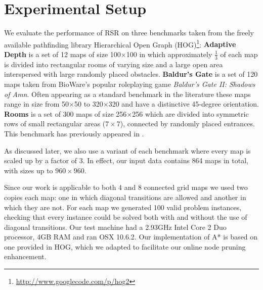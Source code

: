 \section{Experimental Setup}
We evaluate the performance of RSR on three benchmarks taken from
the freely available pathfinding library 
Hierarchical Open Graph (HOG)\footnote{\url{http://www.googlecode.com/p/hog2}}:
{\textbf{Adaptive Depth} is a set of 12 maps of size 100$\times$100 in which approximately
$\frac{1}{3}$ of each map is divided into rectangular rooms of
varying size and a large open area interspersed with 
large randomly placed obstacles.}
{\textbf{Baldur's Gate} is a set of 120 maps taken from BioWare's popular
roleplaying game \emph{Baldur's Gate II: Shadows of Amn}. 
Often appearing as a standard benchmark in the literature 
\cite{bjornsson06,harabor10,pochter10} these maps range in 
size from 50$\times$50 to 320$\times$320 and have a distinctive 45-degree orientation.}
{\textbf{Rooms} is a set of 300 maps of size 256$\times$256 which are
divided into symmetric rows of small rectangular areas ($7\times7$), connected
by randomly placed entrances. This benchmark has previously appeared in
\cite{pochter10}.}

As discussed later, we also use a variant of each benchmark where 
every map is scaled up by a factor of 3. In effect, our input data contains 864 maps in total,
with sizes up to $960\times960$.

Since our work is applicable to both 4 and 8 connected grid maps we used two
copies each map: one in which diagonal transitions are allowed and another
in which they are not.
For each map we generated 100 valid problem instances, checking that every
instance could be solved both with and without the use of diagonal
transitions.
%
Our test machine had a 2.93GHz Intel Core 2 Duo processor, 4GB RAM and
ran OSX 10.6.2.
Our implementation of A* is based on one provided in HOG, which we adapted to
facilitate our online node pruning enhancement.
